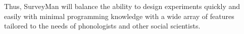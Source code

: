 Thus, SurveyMan will balance the ability to design experiments quickly and easily with minimal programming knowledge
with a wide array of features tailored to the needs of phonologists and other social scientists.




